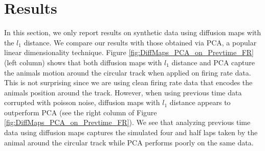 
\section{Results}
In this section, we only report results on  synthetic data using diffusion maps with the $l_{1}$ distance. We compare our results with those obtained via PCA, a popular linear dimensionality technique.  Figure \ref{fig:DiffMaps_PCA_on_Prevtime_FR} (left column) shows that both diffusion maps with $l_1$  distance and PCA capture the animals motion around the circular track when applied on firing rate data. This is not surprising since we are using clean firing rate data that encodes the animals position around the track. However, when using previous time data corrupted  with poisson noise, diffusion maps with $l_{1}$ distance appears to outperform PCA (see the right column of Figure  \ref{fig:DiffMaps_PCA_on_Prevtime_FR}).
We  see that analyzing previous time data using diffusion maps captures the simulated four and half laps taken by the animal around the circular track while PCA  performs poorly on the same data.

